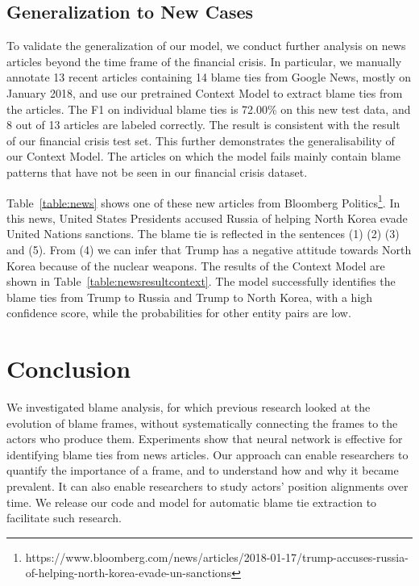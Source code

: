 \documentclass[letterpaper]{article}
\begin{document}
\subsection{Generalization to New Cases}

To validate the generalization of our model, we conduct further analysis on news articles beyond the time frame of the financial crisis. In particular, we manually annotate 13 recent articles containing 14 blame ties from Google News, mostly on January 2018, and use our pretrained Context Model to extract blame ties from the articles. The F1 on individual blame ties is 72.00\% on this new test data, and 8 out of 13 articles are labeled correctly. The result is consistent with the result of our financial crisis test set. This further demonstrates the generalisability of our Context Model. The articles on which the model fails mainly contain blame patterns that have not be seen in our financial crisis dataset.

Table~\ref{table:news} shows one of these new articles from Bloomberg Politics\footnote{https://www.bloomberg.com/news/articles/2018-01-17/trump-accuses-russia-of-helping-north-korea-evade-un-sanctions}. In this news, United States Presidents accused Russia of helping North Korea evade United Nations sanctions. The blame tie is reflected in the sentences (1) (2) (3) and (5). From (4) we can infer that Trump has a negative attitude towards North Korea because of the nuclear weapons. The results of the Context Model are shown in Table~\ref{table:newsresultcontext}. The model successfully identifies the blame ties from Trump to Russia and Trump to North Korea, with a high confidence score, while the probabilities for other entity pairs are low.

\section{Conclusion}

We investigated blame analysis, for which previous research looked at the evolution of blame frames, without systematically connecting the frames to the actors who produce them. Experiments show that neural network is effective for identifying blame ties from news articles.  Our approach can enable researchers to quantify the importance of a frame, and to understand how and why it became prevalent. It can also enable researchers to study actors' position alignments over time. We release our code and model for automatic blame tie extraction to facilitate such research.



\end{document}
